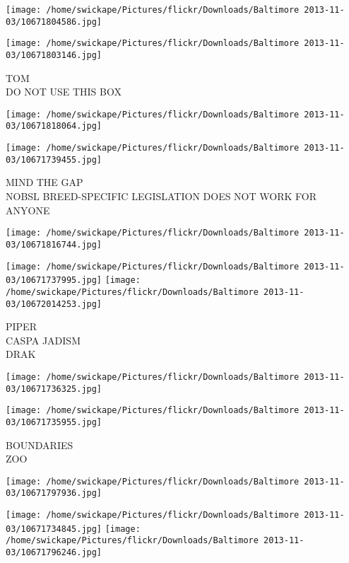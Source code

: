 \documentclass[10pt,letterpaper]{article}
\begin{document}
\texttt{[image: /home/swickape/Pictures/flickr/Downloads/Baltimore 2013-11-03/10671804586.jpg]}

\vspace{0.25in}
\texttt{[image: /home/swickape/Pictures/flickr/Downloads/Baltimore 2013-11-03/10671803146.jpg]}

TOM\\
DO NOT USE THIS BOX\\
\pagebreak

\texttt{[image: /home/swickape/Pictures/flickr/Downloads/Baltimore 2013-11-03/10671818064.jpg]}

\vspace{0.25in}
\texttt{[image: /home/swickape/Pictures/flickr/Downloads/Baltimore 2013-11-03/10671739455.jpg]}

MIND THE GAP\\
NOBSL BREED{-}SPECIFIC LEGISLATION DOES NOT WORK FOR ANYONE\\
\pagebreak

\texttt{[image: /home/swickape/Pictures/flickr/Downloads/Baltimore 2013-11-03/10671816744.jpg]}

\vspace{0.25in}
\texttt{[image: /home/swickape/Pictures/flickr/Downloads/Baltimore 2013-11-03/10671737995.jpg]}
\texttt{[image: /home/swickape/Pictures/flickr/Downloads/Baltimore 2013-11-03/10672014253.jpg]}

PIPER\\
CASPA JADISM\\
DRAK\\
\pagebreak

\texttt{[image: /home/swickape/Pictures/flickr/Downloads/Baltimore 2013-11-03/10671736325.jpg]}

\vspace{0.25in}
\texttt{[image: /home/swickape/Pictures/flickr/Downloads/Baltimore 2013-11-03/10671735955.jpg]}

BOUNDARIES\\
ZOO\\
\pagebreak

\texttt{[image: /home/swickape/Pictures/flickr/Downloads/Baltimore 2013-11-03/10671797936.jpg]}

\vspace{0.25in}
\texttt{[image: /home/swickape/Pictures/flickr/Downloads/Baltimore 2013-11-03/10671734845.jpg]}
\texttt{[image: /home/swickape/Pictures/flickr/Downloads/Baltimore 2013-11-03/10671796246.jpg]}
\end{document}
